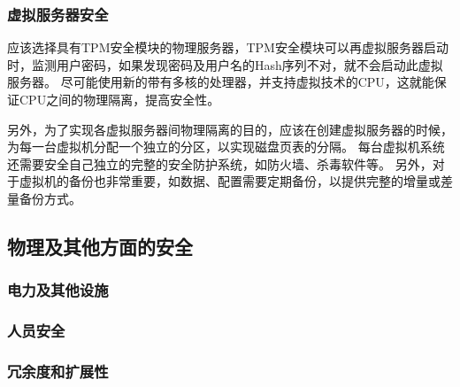 \documentclass[a4paper]{ctexart}
\begin{document}
        \subsubsection{虚拟服务器安全}
            \par 应该选择具有TPM安全模块的物理服务器，TPM安全模块可以再虚拟服务器启动时，监测用户密码，如果发现密码及用户名的Hash序列不对，就不会启动此虚拟服务器。 尽可能使用新的带有多核的处理器，并支持虚拟技术的CPU，这就能保证CPU之间的物理隔离，提高安全性。
            \par 另外，为了实现各虚拟服务器间物理隔离的目的，应该在创建虚拟服务器的时候，为每一台虚拟机分配一个独立的分区，以实现磁盘页表的分隔。 每台虚拟机系统还需要安全自己独立的完整的安全防护系统，如防火墙、杀毒软件等。 另外，对于虚拟机的备份也非常重要，如数据、配置需要定期备份，以提供完整的增量或差量备份方式。

        \subsection{物理及其他方面的安全}
        \subsubsection{电力及其他设施}
        \subsubsection{人员安全}
        \subsubsection{冗余度和扩展性}
\end{document}
